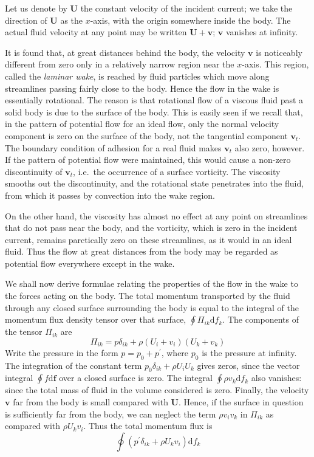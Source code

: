 \documentclass[conference]{IEEEtran}
\theoremstyle{definition}
\theoremstyle{remark}
\begin{document}
    Let us denote by $\mathbf{U}$ the constant velocity of the incident current; we take the direction of $\mathbf{U}$ as the $x$-axis, with the origin somewhere inside the body. The actual fluid velocity at any point may be written $\mathbf{U} + \mathbf{v}$; $\mathbf{v}$ vanishes at infinity.

    It is found that, at great distances behind the body, the velocity $\mathbf{v}$ is noticeably different from zero only in a relatively narrow region near the $x$-axis. This region, called the \emph{laminar wake}, is reached by fluid particles which move along streamlines passing fairly close to the body. Hence the flow in the wake is essentially rotational. The reason is that rotational flow of a viscous fluid past a solid body is due to the surface of the body. This is easily seen if we recall that, in the pattern of potential flow for an ideal flow, only the normal velocity component is zero on the surface of the body, not the tangential component $\mathbf{v}_t$. The boundary condition of adhesion for a real fluid makes $\mathbf{v}_t$ also zero, however. If the pattern of potential flow were maintained, this would cause a non-zero discontinuity of $\mathbf{v}_t$, i.e.\ the occurrence of a surface vorticity. The viscosity smooths out the discontinuity, and the rotational state penetrates into the fluid, from which it passes by convection into the wake region.

    On the other hand, the viscosity has almost no effect at any point on streamlines that do not pass near the body, and the vorticity, which is zero in the incident current, remains parctically zero on these streamlines, as it would in an ideal fluid. Thus the flow at great distances from the body may be regarded as potential flow everywhere except in the wake.

    We shall now derive formulae relating the properties of the flow in the wake to the forces acting on the body. The total momentum transported by the fluid through any closed surface surrounding the body is equal to the integral of the momentum flux density tensor over that surface, $\oint \Pi_{ik} \mathrm{d} f_k$. The components of the tensor $\Pi_{ik}$ are
    \begin{equation*}
        \Pi_{ik} = p \delta_{ik} + \rho (U_i + v_i)(U_k + v_k)
    \end{equation*}
    Write the pressure in the form $p = p_0 + p^\prime$, where $p_0$ is the pressure at infinity. The integration of the constant term $p_0\delta_{ik} + \rho U_i U_k$ gives zeros, since the vector integral $\oint f \mathrm{d} \mathbf{f}$ over a closed surface is zero. The integral $\oint \rho v_k \mathrm{d} f_k$ also vanishes: since the total mass of fluid in the volume considered is zero. Finally, the velocity $\mathbf{v}$ far from the body is small compared with $\mathbf{U}$. Hence, if the surface in question is sufficiently far from the body, we can neglect the term $\rho v_i v_k$ in $\Pi_{ik}$ as compared with $\rho U_k v_i$. Thus the total momentum flux is
    \begin{equation*}
        \oint (p^\prime \delta_{ik} + \rho U_k v_i) \mathrm{d} f_k
    \end{equation*}
    
\end{document}
